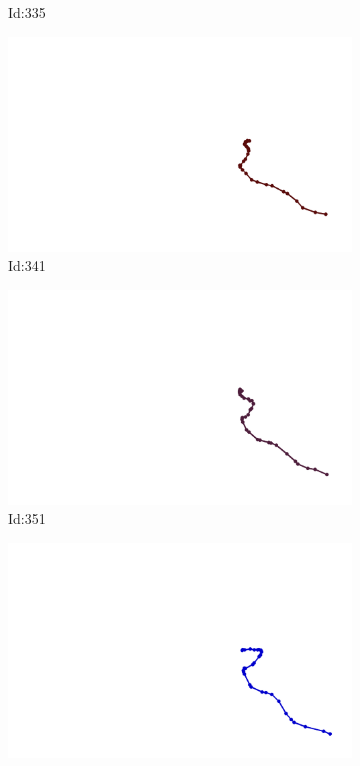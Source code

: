 \documentclass[12pt,twoside]{report}
\begin{document}
\begin{figure}
\begin{subfigure}[b]{0.20\textwidth}
\caption{Id:335}
\end{subfigure}
\begin{subfigure}[b]{0.20\textwidth}
\centering
\includegraphics[width=\textwidth]{../trajectories/341.png}
\caption{Id:341}
\end{subfigure}
\begin{subfigure}[b]{0.20\textwidth}
\centering
\includegraphics[width=\textwidth]{../trajectories/351.png}
\caption{Id:351}
\end{subfigure}
\begin{subfigure}[b]{0.20\textwidth}
\centering
\includegraphics[width=\textwidth]{../trajectories/403.png}

\end{subfigure}
\end{figure}
\end{document}
